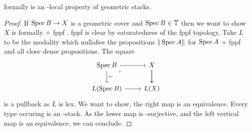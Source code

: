 \begin{lemma}{\label{lemma:FEtLocal}}
	formally \etale is an \etale-local property of geometric stacks.
\end{lemma}
\begin{proof}
	If $\operatorname{Spec} B \to X$ is a geometric cover  and $\operatorname{Spec} B \in \mathbb{T}$  then we want to show $X$ is formally \etale + fppf . fppf is clear by saturatedness of the fppf topology. %
	Take $L$ to be the modality which nullafies the propositions $\|\operatorname{Spec} A\|$ for $\operatorname{Spec} A$ \etale + fppf and all close dense propositions.
	The square 
	\[\begin{tikzcd}
		{\Spec B} & {X} \\
		{L(\Spec B)} & {L(X)}
		\arrow[from=1-1, to=1-2]
		\arrow["\sim", from=1-1, to=2-1]
		\arrow["\ulcorner"{anchor=center, pos=0.125}, draw=none, from=1-1, to=2-2]
		\arrow[from=1-2, to=2-2]
		\arrow[from=1-2, to=2-2]
		\arrow[from=2-1, to=2-2]
	\end{tikzcd}\]
	is a pullback as $L$ is lex. 
	We want to show, the right map is an equivalence. 
	Every type occuring is an \etale-stack.
	As the lower map is \etale-surjective, and the left vertical map is an equivalence, we can conclude.
\end{proof}